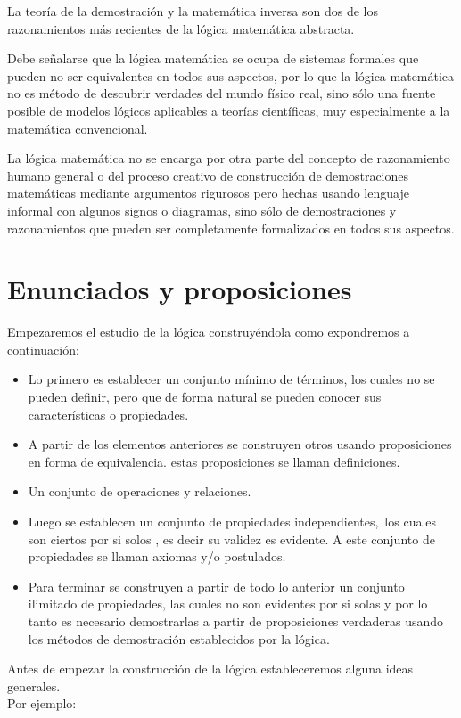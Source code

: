 La teoría de la demostración y la matemática inversa son dos de los
razonamientos más recientes de la lógica matemática abstracta. 

Debe señalarse que la lógica matemática se ocupa de sistemas formales
que pueden no ser equivalentes en todos sus aspectos, por lo que la
lógica matemática no es método de descubrir verdades del mundo físico
real, sino sólo una fuente posible de modelos lógicos aplicables a
teorías científicas, muy especialmente a la matemática convencional. 

La lógica matemática no se encarga por otra parte del concepto de
razonamiento humano general o del proceso creativo de construcción
de demostraciones matemáticas mediante argumentos rigurosos pero hechas
usando lenguaje informal con algunos signos o diagramas, sino sólo
de demostraciones y razonamientos que pueden ser completamente formalizados
en todos sus aspectos. 


\section{Enunciados y proposiciones}

Empezaremos el estudio de la lógica construyéndola como expondremos
a continuación:
\begin{itemize}
\item Lo primero es establecer un conjunto mínimo de términos, los cuales
no se pueden definir, pero que de forma natural se pueden conocer
sus características o propiedades.
\item A partir de los elementos anteriores se construyen otros usando proposiciones
en forma de equivalencia. estas proposiciones se llaman definiciones.
\item Un conjunto de operaciones y relaciones.
\item Luego se establecen un conjunto de propiedades independientes,\ los
cuales son ciertos por si solos , es decir su validez es evidente.
A este conjunto de propiedades se llaman axiomas y/o postulados.
\item Para terminar se construyen a partir de todo lo anterior un conjunto
ilimitado de propiedades, las cuales no son evidentes por si solas
y por lo tanto es necesario demostrarlas a partir de proposiciones
verdaderas usando los métodos de demostración establecidos por la
lógica. 
\end{itemize}
Antes de empezar la construcción de la lógica estableceremos alguna
ideas generales.\\
 Por ejemplo:

